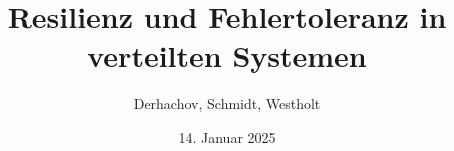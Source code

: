 \newcommand{\titel}{Resilienz und Fehlertoleranz in verteilten Systemen}
\newcommand{\untertitel}{}
\newcommand{\arbeit}{Modul \enquote{Software Engineering}}
\newcommand{\hochschuleLong}{Hochschule für Technik, Wirtschaft und Kultur Leipzig}
\newcommand{\hochschule}{HTWK Leipzig}
\newcommand{\fachbereichLong}{Fakultät Informatik und Medien}
\newcommand{\fachbereich}{FIM}
\newcommand{\autor}{Derhachov, Schmidt, Westholt}
\newcommand{\studiengang}{Masterstudiengang Informatik}
\newcommand{\erstgutachter}{Prof. Dr. Andreas Both, HTWK Leipzig}
\newcommand{\ort}{Leipzig}

\title{\titel}
\author{\autor}
\fakultaet{\fachbereich}
\date{14. Januar 2025}
